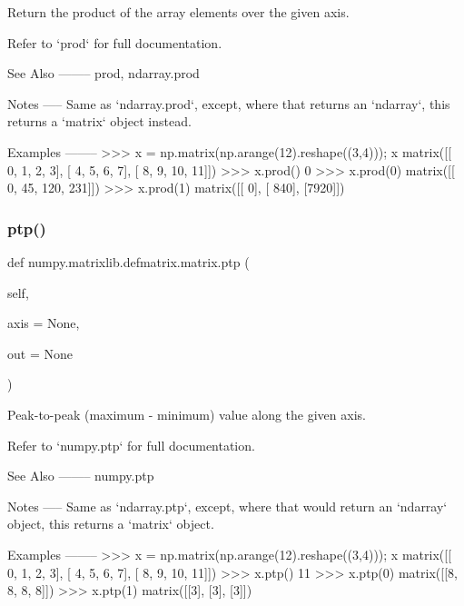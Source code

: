 \begin{DoxyVerb}Return the product of the array elements over the given axis.

Refer to `prod` for full documentation.

See Also
--------
prod, ndarray.prod

Notes
-----
Same as `ndarray.prod`, except, where that returns an `ndarray`, this
returns a `matrix` object instead.

Examples
--------
>>> x = np.matrix(np.arange(12).reshape((3,4))); x
matrix([[ 0,  1,  2,  3],
[ 4,  5,  6,  7],
[ 8,  9, 10, 11]])
>>> x.prod()
0
>>> x.prod(0)
matrix([[  0,  45, 120, 231]])
>>> x.prod(1)
matrix([[   0],
[ 840],
[7920]])\end{DoxyVerb}
 \mbox{\label{classnumpy_1_1matrixlib_1_1defmatrix_1_1matrix_aed051434255d006b61fcf5ab31acb0aa}} 
\subsubsection{\texorpdfstring{ptp()}{ptp()}}
{\footnotesize\ttfamily def numpy.\+matrixlib.\+defmatrix.\+matrix.\+ptp (\begin{DoxyParamCaption}\item[{}]{self,  }\item[{}]{axis = {\ttfamily None},  }\item[{}]{out = {\ttfamily None} }\end{DoxyParamCaption})}

\begin{DoxyVerb}Peak-to-peak (maximum - minimum) value along the given axis.

Refer to `numpy.ptp` for full documentation.

See Also
--------
numpy.ptp

Notes
-----
Same as `ndarray.ptp`, except, where that would return an `ndarray` object,
this returns a `matrix` object.

Examples
--------
>>> x = np.matrix(np.arange(12).reshape((3,4))); x
matrix([[ 0,  1,  2,  3],
[ 4,  5,  6,  7],
[ 8,  9, 10, 11]])
>>> x.ptp()
11
>>> x.ptp(0)
matrix([[8, 8, 8, 8]])
>>> x.ptp(1)
matrix([[3],
[3],
[3]])\end{DoxyVerb}
 \mbox{\label{classnumpy_1_1matrixlib_1_1defmatrix_1_1matrix_aa698bcd00a99ee2ca0dcf9a2d2770eff}} 
